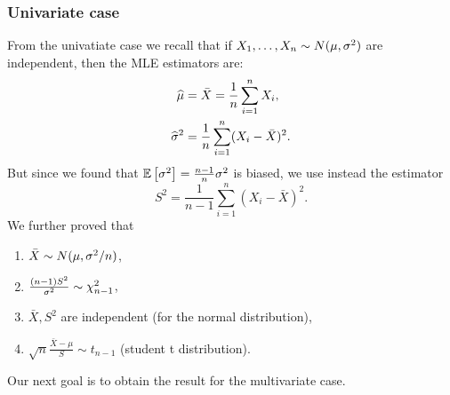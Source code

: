 \subsubsection{Univariate case}
From the univatiate case we recall that if $X_1,\dots,X_n \sim N(\mu, {\sigma^2})$ are independent, then the MLE estimators are:
\begin{align*}
    \widehat{\mu} &= \bar{X} = \frac{1}{n} \sum_{i=1}^n X_i, \\
    \widehat{\sigma}^2 &= \frac{1}{n} \sum_{i=1}^n (X_i-\bar{X})^2.
\end{align*}
But since we found that $\mathbb{E}\left[\sigma^2\right]=\frac{n-1}{n} \sigma^2$ is biased, we use instead the estimator
$$
    S^2 = \frac{1}{n-1} \sum_{i=1}^n (X_i-\bar{X})^2.
$$
We further proved that
\begin{enumerate}
    \item $\bar{X} \sim N(\mu, \sigma^2/n)$,
    \item $\frac{(n-1)S^2}{\sigma^2} \sim \chi^2_{n-1}$,
    \item $\bar{X}, S^2$ are independent (for the normal distribution),
    \item $\sqrt{n} \frac{\bar{X}-\mu}{S} \sim t_{n-1}$ (student t distribution).
\end{enumerate}
Our next goal is to obtain the result for the multivariate case. 

